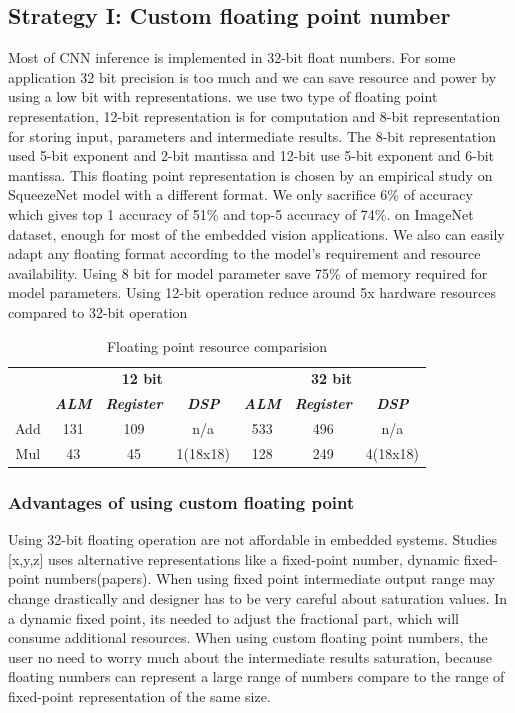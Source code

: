 \documentclass[conference]{IEEEtran}
\begin{document}
\subsection{Strategy I: Custom floating point number
}\label{AA}
Most of CNN inference is implemented in 32-bit float numbers. For some application 32 bit precision is too much and we can save resource and power by using a low bit with representations. we use two type of floating point representation, 12-bit representation is for computation and 8-bit representation for storing input, parameters and intermediate results. The 8-bit representation used 5-bit exponent and 2-bit mantissa and 12-bit use 5-bit exponent and 6-bit mantissa. This floating point representation is chosen by an empirical study on SqueezeNet model with a different format. We only sacrifice 6\% of accuracy which gives top 1 accuracy of 51\% and top-5 accuracy of 74\%. on ImageNet dataset, enough for most of the embedded vision applications. We also can easily adapt any floating format according to the model’s requirement and resource availability. Using 8 bit for model parameter save 75\% of memory required for model parameters. Using 12-bit operation reduce around 5x hardware resources compared to 32-bit operation


\begin{table}[htbp]
\caption{Floating point resource comparision}
\begin{center}
\begin{tabular}{|c|c|c|c|c|c|c|}
\hline
				&\multicolumn{3}{|c|}{\textbf{12 bit}} 											&\multicolumn{3}{|c|}{\textbf{32 bit}}\\
				\cline{2-7} 
 				& \textbf{\textit{ALM}} & \textbf{\textit{Register}} & \textbf{\textit{DSP}}	& \textbf{\textit{ALM}}	& \textbf{\textit{Register}} & \textbf{\textit{DSP}}\\
\hline
Add 		& 131 					& 109 							& n/a 					& 533					&496						&n/a  \\
\hline
Mul	& 43 					& 45 							& 1(18x18) 					& 128					&249						&4(18x18)  \\
\hline
\end{tabular}
\label{tab1}
\end{center}
\end{table}
\subsubsection{Advantages of using custom floating point
}
Using 32-bit floating operation are not affordable in embedded systems. Studies [x,y,z] uses alternative representations like a fixed-point number, dynamic fixed-point numbers(papers). When using fixed point intermediate output range may change drastically and designer has to be very careful about saturation values. In a dynamic fixed point, its needed to adjust the fractional part, which will consume additional resources. When using custom floating point numbers, the user no need to worry much about the intermediate results saturation, because floating numbers can represent a large range of numbers compare to the range of fixed-point representation of the same size. 
\end{document}
